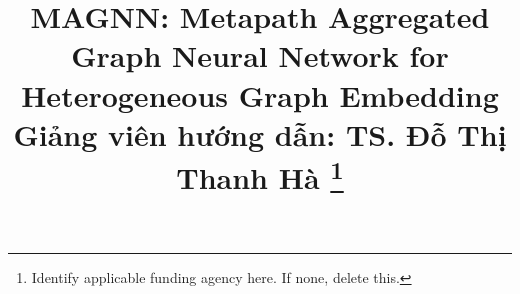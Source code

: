 \documentclass[conference]{IEEEtran}
\theoremstyle{theoremst}
\begin{document}
\title{MAGNN: Metapath Aggregated Graph Neural Network for
Heterogeneous Graph Embedding\\
{\footnotesize \textsuperscript{}Giảng viên hướng dẫn: TS. Đỗ Thị Thanh Hà}
\thanks{Identify applicable funding agency here. If none, delete this.}
}

\author{
\and
{}
}

\maketitle
\end{document}
